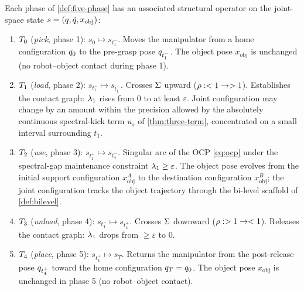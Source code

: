 \begin{definition}\label{def:phase-operators}
Each phase of \cref{def:five-phase} has an associated structural
operator on the joint-space state $s = (q, \dot{q},
x_{\mathrm{obj}})$:
\begin{enumerate}[label=(\roman*),nosep]
  \item $T_{0}$ (\emph{pick}, phase 1):
        $s_{0} \mapsto s_{t_{1}^{-}}$. Moves the manipulator from
        a home configuration $q_{0}$ to the pre-grasp pose
        $q_{t_{1}^{-}}$. The object pose $x_{\mathrm{obj}}$
        is unchanged (no robot--object contact during phase 1).
  \item $T_{1}$ (\emph{load}, phase 2):
        $s_{t_{1}^{-}} \mapsto s_{t_{1}^{+}}$. Crosses $\Sigma$
        upward ($\rho: <1 \to >1$). Establishes the contact
        graph: $\lambda_{1}$ rises from $0$ to at least $\varepsilon$.
        Joint configuration may change by an amount within the
        precision allowed by the absolutely continuous
        spectral-kick term $u_{s}$ of \cref{thm:three-term},
        concentrated on a small interval surrounding $t_{1}$.
  \item $T_{2}$ (\emph{use}, phase 3):
        $s_{t_{1}^{+}} \mapsto s_{t_{4}^{-}}$. Singular arc of
        the OCP \eqref{eq:ocp} under the spectral-gap
        maintenance constraint $\lambda_{1} \ge \varepsilon$. The
        object pose evolves from the initial support
        configuration $x_{\mathrm{obj}}^{A}$ to the destination
        configuration $x_{\mathrm{obj}}^{B}$; the joint
        configuration tracks the object trajectory through the
        bi-level scaffold of \cref{def:bilevel}.
  \item $T_{3}$ (\emph{unload}, phase 4):
        $s_{t_{4}^{-}} \mapsto s_{t_{4}^{+}}$. Crosses $\Sigma$
        downward ($\rho: >1 \to <1$). Releases the contact
        graph: $\lambda_{1}$ drops from $\ge \varepsilon$ to $0$.
  \item $T_{4}$ (\emph{place}, phase 5):
        $s_{t_{4}^{+}} \mapsto s_{T}$. Returns the manipulator
        from the post-release pose $q_{t_{4}^{+}}$ toward
        the home configuration $q_{T} = q_{0}$.
        The object pose $x_{\mathrm{obj}}$ is unchanged in phase
        5 (no robot--object contact).
\end{enumerate}
\end{definition}



